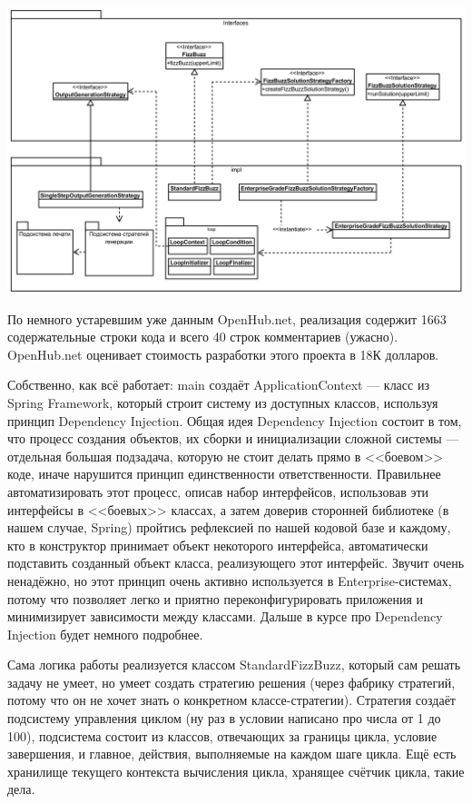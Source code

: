 \documentclass[a5paper]{article}
\begin{document}
\begin{center}
    \includegraphics[width=\textwidth]{fizzBuzzArchitecture.png}
\end{center}

По немного устаревшим уже данным OpenHub.net, реализация содержит 1663 содержательные строки кода и всего 40 строк комментариев (ужасно). OpenHub.net оценивает стоимость разработки этого проекта в 18К долларов.

Собственно, как всё работает: main создаёт ApplicationContext --- класс из Spring Framework, который строит систему из доступных классов, используя принцип Dependency Injection. Общая идея Dependency Injection состоит в том, что процесс создания объектов, их сборки и инициализации сложной системы --- отдельная большая подзадача, которую не стоит делать прямо в <<боевом>> коде, иначе нарушится принцип единственности ответственности. Правильнее автоматизировать этот процесс, описав набор интерфейсов, использовав эти интерфейсы в <<боевых>> классах, а затем доверив сторонней библиотеке (в нашем случае, Spring) пройтись рефлексией по нашей кодовой базе и каждому, кто в конструктор принимает объект некоторого интерфейса, автоматически подставить созданный объект класса, реализующего этот интерфейс. Звучит очень ненадёжно, но этот принцип очень активно используется в Enterprise-системах, потому что позволяет легко и приятно переконфигурировать приложения и минимизирует зависимости между классами. Дальше в курсе про Dependency Injection будет немного подробнее.

Сама логика работы реализуется классом StandardFizzBuzz, который сам решать задачу не умеет, но умеет создать стратегию решения (через фабрику стратегий, потому что он не хочет знать о конкретном классе-стратегии). Стратегия создаёт подсистему управления циклом (ну раз в условии написано про числа от 1 до 100), подсистема состоит из классов, отвечающих за границы цикла, условие завершения, и главное, действия, выполняемые на каждом шаге цикла. Ещё есть хранилище текущего контекста вычисления цикла, хранящее счётчик цикла, такие дела.
\end{document}
